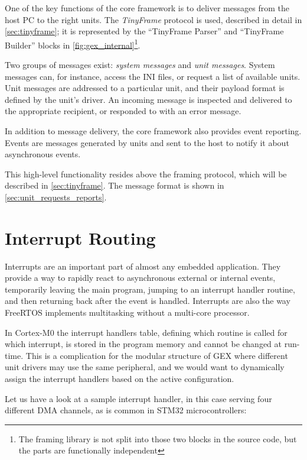 One of the key functions of the core framework is to deliver messages from the host \gls{PC} to the right units. The \textit{TinyFrame} protocol is used, described in detail in \cref{sec:tinyframe}; it is represented by the ``TinyFrame Parser'' and ``TinyFrame Builder'' blocks in \cref{fig:gex_internal}\footnote{The framing library is not split into those two blocks in the source code, but the parts are functionally independent}.

Two groups of messages exist: \textit{system messages} and \textit{unit messages}. System messages can, for instance, access the INI files, or request a list of available units. Unit messages are addressed to a particular unit, and their payload format is defined by the unit's driver. An incoming message is inspected and delivered to the appropriate recipient, or responded to with an error message.

In addition to message delivery, the core framework also provides event reporting. Events are messages generated by units and sent to the host to notify it about asynchronous events.

This high-level functionality resides above the framing protocol, which will be described in \cref{sec:tinyframe}. The message format is shown in \cref{sec:unit_requests_reports}.


\section{Interrupt Routing} \label{sec:irq_routing}

Interrupts are an important part of almost any embedded application. They provide a way to rapidly react to asynchronous external or internal events, temporarily leaving the main program, jumping to an interrupt handler routine, and then returning back after the event is handled. Interrupts are also the way FreeRTOS implements multitasking without a multi-core processor.

In \arm Cortex-M0 the interrupt handlers table, defining which routine is called for which interrupt, is stored in the program memory and cannot be changed at run-time. This is a complication for the modular structure of GEX where different unit drivers may use the same peripheral, and we would want to dynamically assign the interrupt handlers based on the active configuration. 


Let us have a look at a sample interrupt handler, in this case serving four different \gls{DMA} channels, as is common in STM32 microcontrollers:

